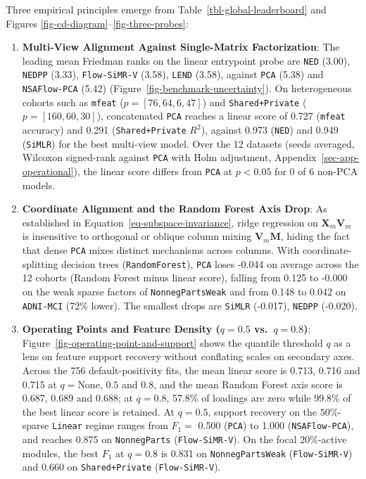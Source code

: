 \documentclass[
  10pt,
  letterpaper,
]{report}
\providecommand{\tightlist}{%
  \setlength{\itemsep}{0pt}\setlength{\parskip}{0pt}}
\begin{document}
Three empirical principles emerge from
Table~\ref{tbl-global-leaderboard} and Figures
\ref{fig-cd-diagram}--\ref{fig-three-probes}:

\begin{enumerate}
\def\labelenumi{\arabic{enumi}.}
\tightlist
\item
  \textbf{Multi-View Alignment Against Single-Matrix Factorization}: The
  leading mean Friedman ranks on the linear entrypoint probe are
  \texttt{NED} (3.00), \texttt{NEDPP} (3.33), \texttt{Flow-SiMR-V}
  (3.58), \texttt{LEND} (3.58), against \texttt{PCA} (5.38) and
  \texttt{NSAFlow-PCA} (5.42) (Figure~\ref{fig-benchmark-uncertainty}).
  On heterogeneous cohorts such as \texttt{mfeat}
  (\(p = [76, 64, 6, 47]\)) and \texttt{Shared+Private}
  (\(p = [160, 60, 30]\)), concatenated \texttt{PCA} reaches a linear
  score of 0.727 (\texttt{mfeat} accuracy) and 0.291
  (\texttt{Shared+Private} \(R^2\)), against 0.973 (\texttt{NED}) and
  0.949 (\texttt{SiMLR}) for the best multi-view model. Over the 12
  datasets (seeds averaged, Wilcoxon signed-rank against \texttt{PCA}
  with Holm adjustment, Appendix~\ref{sec-app-operational}), the linear
  score differs from \texttt{PCA} at \(p < 0.05\) for 0 of 6 non-PCA
  models.
\item
  \textbf{Coordinate Alignment and the Random Forest Axis Drop}: As
  established in Equation~\ref{eq-subspace-invariance}, ridge regression
  on \(\mathbf{X}_m \mathbf{V}_m\) is insensitive to orthogonal or
  oblique column mixing \(\mathbf{V}_m \mathbf{M}\), hiding the fact
  that dense \texttt{PCA} mixes distinct mechanisms across columns. With
  coordinate-splitting decision trees (\texttt{RandomForest}),
  \texttt{PCA} loses -0.044 on average across the 12 cohorts (Random
  Forest minus linear score), falling from 0.125 to -0.000 on the weak
  sparse factors of \texttt{NonnegPartsWeak} and from 0.148 to 0.042 on
  \texttt{ADNI-MCI} (72\% lower). The smallest drops are \texttt{SiMLR}
  (-0.017), \texttt{NEDPP} (-0.020).
\item
  \textbf{Operating Points and Feature Density (\(q = 0.5\)
  vs.~\(q = 0.8\))}: Figure~\ref{fig-operating-point-and-support} shows
  the quantile threshold \(q\) as a lens on feature support recovery
  without conflating scales on secondary axes. Across the 756
  default-positivity fits, the mean linear score is 0.713, 0.716 and
  0.715 at \(q = \text{None}\), \(0.5\) and \(0.8\), and the mean Random
  Forest axis score is 0.687, 0.689 and 0.688; at \(q = 0.8\), 57.8\% of
  loadings are zero while 99.8\% of the best linear score is retained.
  At \(q = 0.5\), support recovery on the \(50\%\)-sparse
  \texttt{Linear} regime ranges from \(F_1 =\) 0.500 (\texttt{PCA}) to
  1.000 (\texttt{NSAFlow-PCA}), and reaches 0.875 on
  \texttt{NonnegParts} (\texttt{Flow-SiMR-V}). On the focal
  \(20\%\)-active modules, the best \(F_1\) at \(q = 0.8\) is 0.831 on
  \texttt{NonnegPartsWeak} (\texttt{Flow-SiMR-V}) and 0.660 on
  \texttt{Shared+Private} (\texttt{Flow-SiMR-V}).
\end{enumerate}
\end{document}
